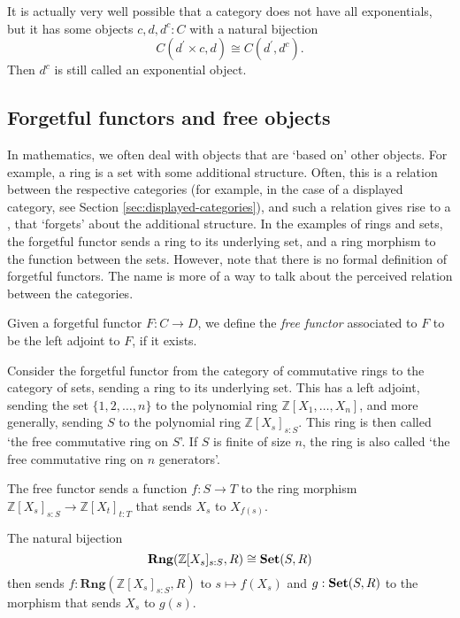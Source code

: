 \begin{remark}
  It is actually very well possible that a category does not have all exponentials, but it has some objects $ c, d, d^c: C $ with a natural bijection
  \[ C(d^\prime \times c, d) \cong C(d^\prime, d^c). \]
  Then $ d^c $ is still called an exponential object.
\end{remark}

\subsection{Forgetful functors and free objects}

In mathematics, we often deal with objects that are `based on' other objects. For example, a ring is a set with some additional structure. Often, this is a relation between the respective categories (for example, in the case of a displayed category, see Section \ref{sec:displayed-categories}), and such a relation gives rise to a , that `forgets' about the additional structure. In the examples of rings and sets, the forgetful functor sends a ring to its underlying set, and a ring morphism to the function between the sets. However, note that there is no formal definition of forgetful functors. The name is more of a way to talk about the perceived relation between the categories.

\begin{definition}
  Given a forgetful functor $ F: C \to D $, we define the \textit{free functor} associated to $ F $ to be the left adjoint to $ F $, if it exists.
\end{definition}

\begin{example}
  Consider the forgetful functor from the category of commutative rings to the category of sets, sending a ring to its underlying set. This has a left adjoint, sending the set $ \{ 1, 2, \dots, n \} $ to the polynomial ring $ \mathbb Z[X_1, \dots, X_n] $, and more generally, sending $ S $ to the polynomial ring $ \mathbb Z[X_s]_{s : S} $. This ring is then called `the free commutative ring on $ S $'. If $ S $ is finite of size $ n $, the ring is also called `the free commutative ring on $ n $ generators'.

  The free functor sends a function $ f: S \to T $ to the ring morphism $ \mathbb Z[X_s]_{s: S} \to \mathbb Z[X_t]_{t: T} $ that sends $ X_s $ to $ X_{f(s)} $.

  The natural bijection
  \[ \mathbf{Rng}(\mathbb Z[X_s]_{s : S}, R) \cong \mathbf{Set}(S, R) \]
  then sends $ f: \mathbf{Rng}(\mathbb Z[X_s]_{s : S}, R) $ to $ s \mapsto f(X_s) $ and $ g: \mathbf{Set}(S, R) $ to the morphism that sends $ X_s $ to $ g(s) $.
\end{example}

